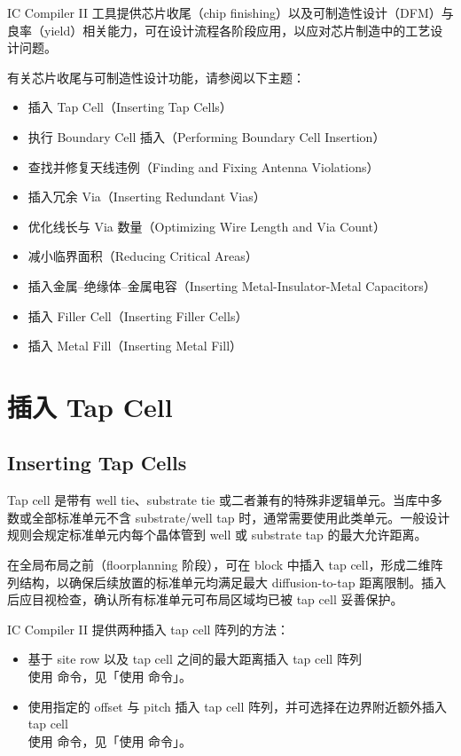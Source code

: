 \label{chap:dfm}

IC Compiler II 工具提供芯片收尾（chip finishing）以及可制造性设计（DFM）与良率（yield）相关能力，可在设计流程各阶段应用，以应对芯片制造中的工艺设计问题。

有关芯片收尾与可制造性设计功能，请参阅以下主题：
\begin{itemize}
  \item 插入 Tap Cell（Inserting Tap Cells）
  \item 执行 Boundary Cell 插入（Performing Boundary Cell Insertion）
  \item 查找并修复天线违例（Finding and Fixing Antenna Violations）
  \item 插入冗余 Via（Inserting Redundant Vias）
  \item 优化线长与 Via 数量（Optimizing Wire Length and Via Count）
  \item 减小临界面积（Reducing Critical Areas）
  \item 插入金属--绝缘体--金属电容（Inserting Metal-Insulator-Metal Capacitors）
  \item 插入 Filler Cell（Inserting Filler Cells）
  \item 插入 Metal Fill（Inserting Metal Fill）
\end{itemize}

\section{插入 Tap Cell}
\subsection*{Inserting Tap Cells}

Tap cell 是带有 well tie、substrate tie 或二者兼有的特殊非逻辑单元。当库中多数或全部标准单元不含 substrate/well tap 时，通常需要使用此类单元。一般设计规则会规定标准单元内每个晶体管到 well 或 substrate tap 的最大允许距离。

在全局布局之前（floorplanning 阶段），可在 block 中插入 tap cell，形成二维阵列结构，以确保后续放置的标准单元均满足最大 diffusion-to-tap 距离限制。插入后应目视检查，确认所有标准单元可布局区域均已被 tap cell 妥善保护。

IC Compiler II 提供两种插入 tap cell 阵列的方法：
\begin{itemize}
  \item 基于 site row 以及 tap cell 之间的最大距离插入 tap cell 阵列\\
        使用  命令，见「使用  命令」。
  \item 使用指定的 offset 与 pitch 插入 tap cell 阵列，并可选择在边界附近额外插入 tap cell\\
        使用  命令，见「使用  命令」。
\end{itemize}

